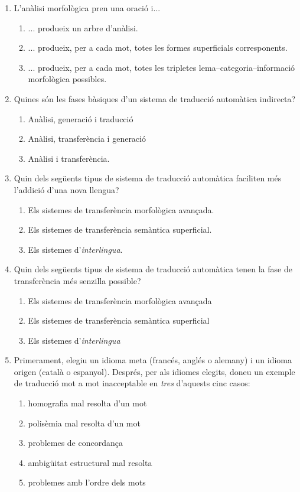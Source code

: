 \begin{enumerate}
\item L'anàlisi morfològica pren una oració i...
\begin{enumerate}
\item ... produeix un arbre d'anàlisi.
\item ... produeix, per a cada mot, totes les formes superficials corresponents.
\item ... produeix, per a cada mot, totes les tripletes
  lema--categoria--informació morfològica possibles.
\end{enumerate}


\item Quines són les fases bàsiques d'un sistema de traducció
 automàtica indirecta?
 \begin{enumerate}
 \item Anàlisi, generació i traducció
 \item Anàlisi, transferència i generació
  \item Anàlisi i transferència.
 \end{enumerate}

\item Quin dels següents tipus de sistema de traducció
automàtica faciliten més l'addició d'una nova 
llengua?
\begin{enumerate}
\item Els sistemes de transferència morfològica avançada.
\item Els sistemes de transferència semàntica superficial.
\item Els sistemes d'\emph{interlingua}.
\end{enumerate}


\item Quin dels següents tipus de sistema de traducció
automàtica tenen la fase de transferència més senzilla possible?
\begin{enumerate}
\item Els sistemes de transferència morfològica avançada
\item Els sistemes de transferència semàntica superficial
\item Els sistemes d'\emph{interlingua}
\end{enumerate}

    \item Primerament, elegiu un idioma meta (francés, anglés o
      alemany) i un idioma origen (català o espanyol). Després, per
      als idiomes elegits, doneu un exemple de traducció mot a mot
      inacceptable en \emph{tres} d'aquests cinc casos:
      \begin{enumerate}
      \item homografia mal resolta d'un mot
      \item polisèmia mal resolta d'un mot
      \item problemes de concordança
      \item ambigüitat estructural mal resolta
      \item problemes amb l'ordre dels mots
      \end{enumerate}
      

\end{enumerate}
